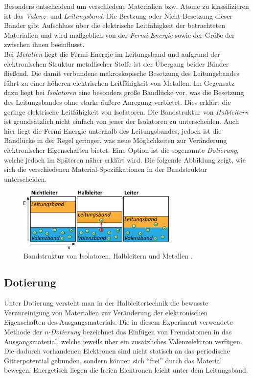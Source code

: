 \noindent Besonders entscheidend um verschiedene Materialien bzw. Atome zu klassifizieren ist das \textit{Valenz-} und \textit{Leitungsband}. Die Bestzung 
oder Nicht-Besetzung dieser Bänder gibt Aufschluss über die elektrische Leitfähigkeit der betrachteten Materialien und wird maßgeblich von der 
\textit{Fermi-Energie} sowie der Größe der  zwischen ihnen beeinflusst. \\

\noindent Bei \textit{Metallen} liegt die Fermi-Energie im Leitungsband und aufgrund der elektronischen Struktur metallischer Stoffe ist der Übergang beider 
Bänder fließend. Die damit verbundene makroskopische Besetzung des Leitungsbandes führt zu einer höheren elektrischen Leitfähigkeit von Metallen.
Im Gegensatz dazu liegt bei \textit{Isolatoren} eine besonders große Bandlücke vor, was die Besetzung des Leitungsbandes ohne starke äußere Anregung verbietet.
Dies erklärt die geringe elektrische Leitfähigkeit von Isolatoren. Die Bandstruktur von \textit{Halbleitern} ist grundsätzlich nicht einfach von jener der 
Isolatoren zu unterscheiden. Auch hier liegt die Fermi-Energie unterhalb des Leitungsbandes, jedoch ist die Bandlücke in der Regel geringer, was neue 
Möglichkeiten zur Veränderung elektronischer Eigenschaften bietet. Eine Option ist die sogenannte \textit{Dotierung}, welche jedoch im Späteren 
näher erklärt wird. Die folgende Abbildung zeigt, wie sich die verschiedenen Material-Spezifikationen in der Bandstruktur unterscheiden. \\

\begin{figure}[H]
    \centering
    \includegraphics[width=0.7\textwidth]{content/MetIsoHalb.png}
    \caption{Bandstruktur von Isolatoren, Halbleitern und Metallen \cite{Bandstrukturen}.}
    \label{fig:MetIsoHalb}
\end{figure}

\subsection{Dotierung}

\noindent Unter Dotierung versteht man in der Halbleitertechnik die bewusste Verunreinigung von Materialien zur Veränderung
der elektronischen Eigenschaften des Ausgangsmaterials. Die in diesem Experiment verwendete Methode der \textit{n-Dotierung}
bezeichnet das Einfügen von Fremdatomen in das Ausgangsmaterial, welche jeweils über ein zusätzliches Valenzelektron verfügen. 
Die dadurch vorhandenen Elektronen sind nicht statisch an das periodische Gitterpotential gebunden, sondern können sich \enquote{frei} 
durch das Material bewegen. Energetisch liegen die freien Elektronen leicht unter dem Leitungsband.

